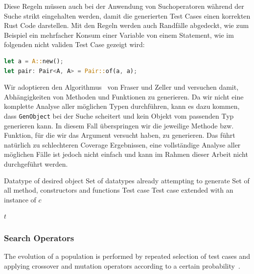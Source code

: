 \documentclass{article}
\newcommand{\Desc}[2]{\State \makebox[2em][l]{#1}#2}
\begin{document}
Diese Regeln müssen auch bei der Anwendung von Suchoperatoren während der Suche strikt eingehalten werden, damit die generierten Test Cases einen korrekten Rust Code darstellen. Mit den Regeln werden auch Randfälle abgedeckt, wie zum Beispiel ein mehrfacher Konsum einer Variable von einem Statement, wie im folgenden nicht validen Test Case gezeigt wird:
\begin{lstlisting}[language=Rust, style=boxed, caption={}]
let a = A::new();
let pair: Pair<A, A> = Pair::of(a, a);
\end{lstlisting}

Wir adoptieren den Algorithmus~ von Fraser und Zeller und versuchen damit, Abhängigkeiten von Methoden und Funktionen zu generieren. Da wir nicht eine komplette Analyse aller möglichen Typen durchführen, kann es dazu kommen, dass \lstinline{GenObject} bei der Suche scheitert und kein Objekt vom passenden Typ generieren kann. In diesem Fall überspringen wir die jeweilige Methode bzw. Funktion, für die wir das Argument versucht haben, zu generieren. Das führt natürlich zu schlechteren Coverage Ergebnissen, eine vollständige Analyse aller möglichen Fälle ist jedoch nicht einfach und kann im Rahmen dieser Arbeit nicht durchgeführt werden.

\begin{algorithm}[t]
\caption{$GenObject(c, G, M, t)$}\label{alg:genobject}
\begin{algorithmic}
\Input
  \Desc{$c$}{Datatype of desired object}
  \Desc{$G$}{Set of datatypes already attempting to generate}
  \Desc{$M$}{Set of all method, constructors and functions}
  \Desc{$t$}{Test case}
\EndInput
\Output
  \Desc{$t$}{Test case extended with an instance of $c$}
\EndOutput
{}

  \EndIf
\EndFor
{}
\State \Return $t$
\end{algorithmic}
\end{algorithm}

\subsubsection{Search Operators}
The evolution of a population is performed by repeated selection of test cases and applying crossover and mutation operators according to a certain probability~\cite{Fraser2012}.
\end{document}
